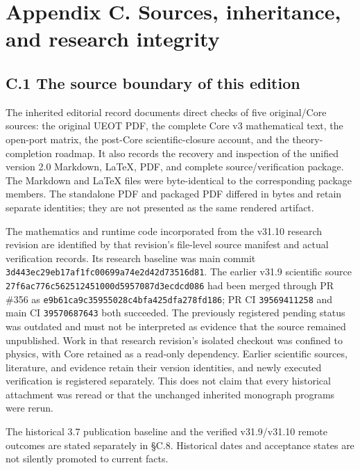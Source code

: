 \documentclass[
  11pt,
  oneside]{book}
\begin{document}
\chapter{Appendix C. Sources, inheritance, and research
integrity}\label{appendix-c}

\section{C.1 The source boundary of this edition}

The inherited editorial record documents direct checks of five
original/Core sources: the original UEOT PDF, the complete Core v3
mathematical text, the open-port matrix, the post-Core
scientific-closure account, and the theory-completion roadmap. It also
records the recovery and inspection of the unified version 2.0 Markdown,
LaTeX, PDF, and complete source/verification package. The Markdown and
LaTeX files were byte-identical to the corresponding package members.
The standalone PDF and packaged PDF differed in bytes and retain
separate identities; they are not presented as the same rendered
artifact.

The mathematics and runtime code incorporated from the v31.10 research
revision are identified by that revision's file-level source manifest
and actual verification records. Its research baseline was main commit
\texttt{3d443ec29eb1\allowbreak 7af1fc00699a\allowbreak 74e2d42d7351\allowbreak 6d81}. The earlier v31.9
scientific source \texttt{27f6ac776c56\allowbreak 2512451000d5\allowbreak 957087d3ecdc\allowbreak d086} had
been merged through PR \#356 as
\texttt{e9b61ca9c359\allowbreak 55028c4bfa42\allowbreak 5dfa278fd186}; PR CI
\texttt{39569411258} and main CI \texttt{39570687643} both succeeded.
The previously registered pending status was outdated and must not be
interpreted as evidence that the source remained unpublished. Work in
that research revision's isolated checkout was confined to physics, with
Core retained as a read-only dependency. Earlier scientific sources,
literature, and evidence retain their version identities, and newly
executed verification is registered separately. This does not claim that
every historical attachment was reread or that the unchanged inherited
monograph programs were rerun.

The historical 3.7 publication baseline and the verified v31.9/v31.10
remote outcomes are stated separately in §C.8. Historical dates and
acceptance states are not silently promoted to current facts.
\end{document}
